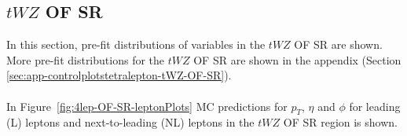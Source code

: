 \subsection{$tWZ$ OF SR}
\label{sec:controlplotstetralepton-tWZ-OF-SR}


In this section, pre-fit distributions of variables in the $tWZ$ OF SR are shown. More pre-fit distributions for the $tWZ$ OF SR are shown in the appendix (Section \ref{sec:app-controlplotstetralepton-tWZ-OF-SR}).\\\\

In Figure~\ref{fig:4lep-OF-SR-leptonPlots} MC predictions for $p_{T}$, $\eta$ and $\phi$ for leading (L) leptons and next-to-leading (NL) leptons in the $tWZ$ OF SR region is shown.


